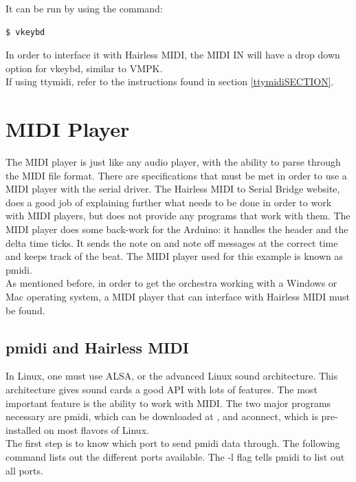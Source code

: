 \documentclass[11pt, a4paper]{report}
\begin{document}
It can be run by using the command:

\begin{lstlisting}[language=bash]
  $ vkeybd
\end{lstlisting}

In order to interface it with Hairless MIDI, the MIDI IN will have a drop down option for vkeybd, similar to VMPK. \\

If using ttymidi, refer to the instructions found in section \ref{ttymidiSECTION}.

\section{MIDI Player}

The MIDI player is just like any audio player, with the ability to parse through the MIDI file format. There are specifications that must be met in order to use a MIDI player with the serial driver. The Hairless MIDI to Serial Bridge website, \cite{HairlessMIDI} does a good job of explaining further what needs to be done in order to work with MIDI players, but does not provide any programs that work with them. The MIDI player does some back-work for the Arduino: it handles the header and the delta time ticks. It sends the note on and note off messages at the correct time and keeps track of the beat. The MIDI player used for this example is known as pmidi. \\

As mentioned before, in order to get the orchestra working with a Windows or Mac operating system, a MIDI player that can interface with Hairless MIDI must be found. 

\subsection{pmidi and Hairless MIDI}

In Linux, one must use ALSA, or the advanced Linux sound architecture. This architecture gives sound cards a good API with lots of features. The most important feature is the ability to work with MIDI. The two major programs necessary are pmidi, which can be downloaded at \cite{pmidi}, and aconnect, which is pre-installed on most flavors of Linux. \\

The first step is to know which port to send pmidi data through. The following command lists out the different ports available. The -l flag tells pmidi to list out all ports. 
\end{document}
